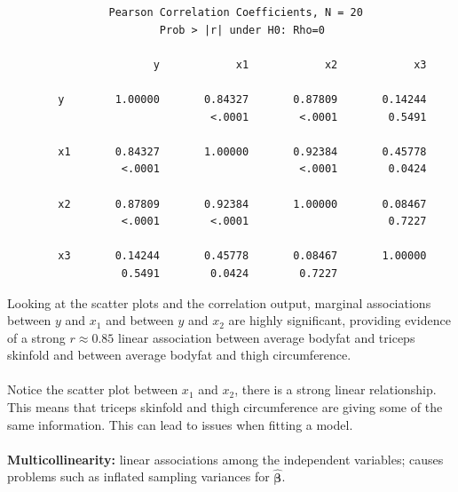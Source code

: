\begin{small}
\begin{verbatim}
                Pearson Correlation Coefficients, N = 20 
                        Prob > |r| under H0: Rho=0
 
                       y            x1            x2            x3

        y        1.00000       0.84327       0.87809       0.14244
                                <.0001        <.0001        0.5491

        x1       0.84327       1.00000       0.92384       0.45778
                  <.0001                      <.0001        0.0424

        x2       0.87809       0.92384       1.00000       0.08467
                  <.0001        <.0001                      0.7227

        x3       0.14244       0.45778       0.08467       1.00000
                  0.5491        0.0424        0.7227              
\end{verbatim}
\end{small}

Looking at the scatter plots and the correlation output, marginal associations between $y$ and $x_1$ and between
$y$ and $x_2$ are highly significant, providing evidence of a strong $r\approx 0.85$ linear association between average
bodyfat and triceps skinfold and between average bodyfat and thigh circumference.\\~\\

Notice the scatter plot between $x_1$ and $x_2$, there is a strong linear relationship.  This means that triceps skinfold and thigh circumference are giving some of the same information.  This can lead to issues when fitting a model.\\~\\
\textbf{Multicollinearity:} linear associations among the independent variables; causes problems such as inflated sampling variances for $\hat{\boldsymbol{\beta}}$.

